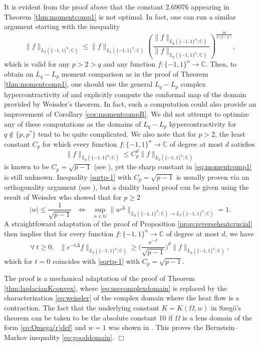 \documentclass[11pt,reqno]{amsart}
\renewcommand{\leq}{\leqslant}
\renewcommand{\geq}{\geqslant}
\newcommand{\1}{\mathbf 1}
\theoremstyle{remark}
\newcommand{\C}{\mathbb C}
\newcommand{\mb}{\mathbb}
\begin{document}
It is evident from the proof above that the constant 2.69076 appearing in Theorem \ref{thm:momentcomp1} is not optimal. In fact, one can run a similar argument starting with the inequality
\begin{equation}
\|f\|_{L_2(\{-1,1\}^n;\C)} \leq \|f\|_{L_1(\{-1,1\}^n;\C)}  \left(\frac{\|f\|_{L_p(\{-1,1\}^n;\C)}}{\|f\|_{L_{q}(\{-1,1\}^n;\C)}}\right)^{\frac{pq}{2(p-q)}},
\end{equation}
which is valid for any $p>2>q$ and any function $f:\{-1,1\}^n\to\C$. Then, to obtain an $L_q-L_p$ moment comparison as in the proof of Theorem \ref{thm:momentcomp1}, one should use the general $L_q-L_p$ complex hypercontractivity of \cite{Wei79} and explicitly compute the conformal map of the domain provided by Weissler's theorem. In fact, such a computation could also provide an improvement of Corollary \ref{cor:momentcompR}. We did not attempt to optimize any of these computations as the domains of $L_q-L_p$ hypercontractivity for $q\notin\{p,p^\ast\}$ tend to be quite complicated. We also note that for $p>2$, the least constant $C_p$ for which every function $f:\{-1,1\}^n\to\C$ of degree at most $d$ satisfies
\begin{equation} \label{sqrtp-1}
\|f\|_{L_p(\{-1,1\}^n;\C)} \leq C_p^{d} \|f\|_{L_2(\{-1,1\}^n;\C)}
\end{equation}
is known to be $C_p=\sqrt{p-1}$ (see \cite{IT18}), yet the sharp constant in \eqref{eq:momentcomp1} is still unknown. Inequality \eqref{sqrtp-1} with $C_p=\sqrt{p-1}$ is usually proven via an orthogonality argument (see \cite[Theorem~9.21]{O'D14}), but a duality based proof can be given using the result of Weissler \cite{Wei79} who showed that for $p\geq2$
\begin{equation} \label{www}
|w|\leq \frac{1}{\sqrt{p-1}} \ \ \ \Longleftrightarrow \ \ \ 
\sup_{n\in\mb{N}} \|w^{\Delta}\|_{{L_p(\{-1,1\}^n;\C)}\to {L_2(\{-1,1\}^n;\C)}}=1.
\end{equation}
A straightfoward adaptation of the proof of Proposition \ref{prop:reverseheatcrucial} then implies that for every function $f:\{-1,1\}^n\to\C$ of degree at most $d$, we have
\begin{equation}
\forall \ t\geq0, \ \ \ \|e^{-t\Delta}f\|_{L_2(\{-1,1\}^n;\C)} \geq \Big(\frac{e^{-t}}{\sqrt{p-1}}\Big)^d \|f\|_{L_p(\{-1,1\}^n;\C)},
\end{equation}
which for $t=0$ coincides with \eqref{sqrtp-1} with $C_p=\sqrt{p-1}$.
\medskip

The proof is a mechanical adaptation of the proof of Theorem \ref{thm:laplacianKconvex}, where \eqref{eq:usecomplexdomain} is replaced by the characterization \eqref{eq:weissler} of the complex domain where the heat flow is a contraction. The fact that the underlying constant $K=K(\Omega,w)$ in Szeg\"o's theorem can be taken to be the absolute constant 10 if $\Omega$ is a lens domain of the form \eqref{eq:Omega(r)def} and $w=1$ was shown in \cite[Proposition~15]{EI18}. This proves the Bernstein--Markov inequality \eqref{eq:gooddomain}.
\hfill$\Box$
\end{document}
